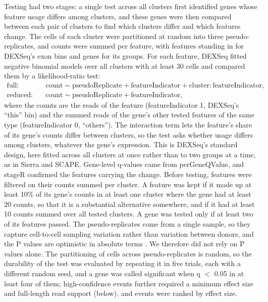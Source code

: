 Testing had two stages: a single test across all clusters first identified genes whose feature usage differs among clusters, and these genes were then compared between each pair of clusters to find which clusters differ and which features change. The cells of each cluster were partitioned at random into three pseudo-replicates, and counts were summed per feature, with features standing in for DEXSeq's exon bins and genes for its groups. For each feature, DEXSeq fitted negative binomial models over all clusters with at least 30 cells and compared them by a likelihood-ratio test:
\begin{align*}
\text{full:}\quad & \text{count} \sim \text{pseudoReplicate} + \text{featureIndicator} + \text{cluster}{:}\text{featureIndicator},\\
\text{reduced:}\quad & \text{count} \sim \text{pseudoReplicate} + \text{featureIndicator},
\end{align*}
where the counts are the reads of the feature (featureIndicator 1, DEXSeq's ``this'' bin) and the summed reads of the gene's other tested features of the same type (featureIndicator 0, ``others''). The interaction term lets the feature's share of its gene's counts differ between clusters, so the test asks whether usage differs among clusters, whatever the gene's expression. This is DEXSeq's standard design, here fitted across all clusters at once rather than to two groups at a time, as in Sierra and SCAPE. Gene-level q-values came from perGeneQValue, and stageR \citep{vandenberge2017} confirmed the features carrying the change. Before testing, features were filtered on their counts summed per cluster. A feature was kept if it made up at least 10\% of its gene's counts in at least one cluster where the gene had at least 20 counts, so that it is a substantial alternative somewhere, and if it had at least 10 counts summed over all tested clusters. A gene was tested only if at least two of its features passed.  The pseudo-replicates come from a single sample, so they capture cell-to-cell sampling variation rather than variation between donors, and the P values are optimistic in absolute terms \citep{squair2021}. We therefore did not rely on P values alone. The partitioning of cells across pseudo-replicates is random, so the durability of the test was evaluated by repeating it in five trials, each with a different random seed, and a gene was called significant when q $<$ 0.05 in at least four of them; high-confidence events further required a minimum effect size and full-length read support (below), and events were ranked by effect size.

